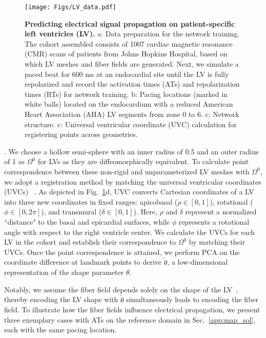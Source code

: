 \documentclass[review]{elsarticle}
\def\refd{0}
\def\Omegaref{{\Omega^\refd}}
\begin{document}
\begin{figure}
    \centering
	\texttt{[image: Figs/LV\_data.pdf]} 
    \caption{\textbf{Predicting electrical signal propagation on patient-specific left ventricles (LV).} a: Data preparation for the network training. The cohort assembled consists of 1007 cardiac magnetic resonance (CMR) scans of patients from Johns Hopkins Hospital, based on which LV meshes and fiber fields are generated. Next, we simulate a paced beat for 600 ms at an endocardial site until the LV is fully repolarized and record the activation times (ATs) and repolarization times (RTs) for network training. b: Pacing locations (marked in white balls) located on the endocardium with a reduced American Heart Association (AHA) LV segments from zone 0 to 6. c: Network structure. c: Universal ventricular coordinate (UVC) calculation for registering points across geometries. }
    \label{fig:LV_data}
\end{figure}

. We choose a hollow semi-sphere with an inner radius of 0.5 and an outer radius of 1 as $\Omegaref$ for LVs as they are diffeomorphically equivalent. To calculate point correspondence between these non-rigid and unparameterized LV meshes with $\Omegaref$, we adopt a registration method by matching the universal ventricular coordinates (UVCs) ~\cite{bayer2012novel,bayer2018universal}. As depicted in Fig.~\ref{fig:LV_data}d, UVC converts Cartesian coordinates of a LV into three new coordinates in fixed ranges: apicobasal ($\rho \in [0, 1]$), rotational ($\phi \in [0, 2\pi]$), and transmural ($\delta \in [0, 1]$). Here, $\rho$ and $\delta$ represent a normalized ``distance" to the basal and epicardial surfaces, while $\phi$ represents a rotational angle with respect to the right ventricle center. We calculate the UVCs for each LV in the cohort and establish their correspondence to $\Omegaref$ by matching their UVCs. Once the point correspondence is attained, we perform PCA on the coordinate difference at landmark points to derive $\tilde{\theta}$, a low-dimensional representation of the shape parameter $\theta$. 

Notably, we assume the fiber field depends solely on the shape of the LV~\cite{bayer2012novel}, thereby encoding the LV shape with $\tilde{\theta}$ simultaneously leads to encoding the fiber field. To illustrate how the fiber fields influence electrical propagation, we present three exemplary cases with ATs on the reference domain in Sec.~\ref{app:map_sol}, each with the same pacing location.  
\end{document}
